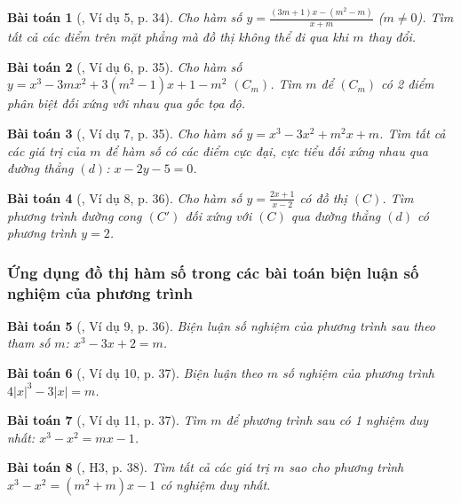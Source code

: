 \documentclass[12pt]{article}
\numberwithin{equation}{section}
\newtheorem{baitoan}{Bài toán}[section]
\begin{document}
\begin{baitoan}[\cite{TL_chuyen_Toan_Giai_Tich_12}, Ví dụ 5, p. 34]
	Cho hàm số $y = \frac{(3m + 1)x - (m^2 - m)}{x + m}$ ($m\ne 0$). Tìm tất cả các điểm trên mặt phẳng mà đồ thị không thể đi qua khi $m$ thay đổi.
\end{baitoan}

\begin{baitoan}[\cite{TL_chuyen_Toan_Giai_Tich_12}, Ví dụ 6, p. 35]
	Cho hàm số $y = x^3 - 3mx^2 + 3(m^2 - 1)x + 1 - m^2$ $(C_m)$. Tìm $m$ để $(C_m)$ có 2 điểm phân biệt đối xứng với nhau qua gốc tọa độ.
\end{baitoan}

\begin{baitoan}[\cite{TL_chuyen_Toan_Giai_Tich_12}, Ví dụ 7, p. 35]
	Cho hàm số $y = x^3 - 3x^2 + m^2x + m$. Tìm tất cả các giá trị của $m$ để hàm số có các điểm cực đại, cực tiểu đối xứng nhau qua đường thẳng $(d)$: $x - 2y - 5 = 0$.
\end{baitoan}

\begin{baitoan}[\cite{TL_chuyen_Toan_Giai_Tich_12}, Ví dụ 8, p. 36]
	Cho hàm số $y = \frac{2x + 1}{x - 2}$ có đồ thị $(C)$. Tìm phương trình đường cong $(C')$ đối xứng với $(C)$ qua đường thẳng $(d)$ có phương trình $y = 2$. 
\end{baitoan}

\subsubsection{Ứng dụng đồ thị hàm số trong các bài toán biện luận số nghiệm của phương trình}

\begin{baitoan}[\cite{TL_chuyen_Toan_Giai_Tich_12}, Ví dụ 9, p. 36]
	Biện luận số nghiệm của phương trình sau theo tham số $m$: $x^3 - 3x + 2 = m$.
\end{baitoan}

\begin{baitoan}[\cite{TL_chuyen_Toan_Giai_Tich_12}, Ví dụ 10, p. 37]
	Biện luận theo $m$ số nghiệm của phương trình $4|x|^3 - 3|x| = m$.
\end{baitoan}

\begin{baitoan}[\cite{TL_chuyen_Toan_Giai_Tich_12}, Ví dụ 11, p. 37]
	Tìm $m$ để phương trình sau có 1 nghiệm duy nhất: $x^3 - x^2 = mx - 1$.
\end{baitoan}

\begin{baitoan}[\cite{TL_chuyen_Toan_Giai_Tich_12}, H3, p. 38]
	Tìm tất cả các giá trị $m$ sao cho phương trình $x^3 - x^2 = (m^2 + m)x - 1$ có nghiệm duy nhất.
\end{baitoan}
\end{document}
